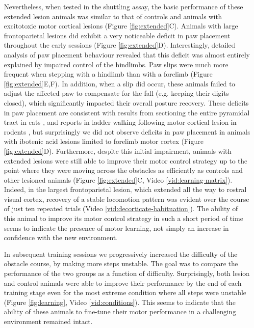 Nevertheless, when tested in the shuttling assay, the basic performance of these extended lesion animals was similar to that of controls and animals with excitotoxic motor cortical lesions (Figure \ref{fig:extended}C). Animals with large frontoparietal lesions did exhibit a very noticeable deficit in paw placement throughout the early sessions (Figure \ref{fig:extended}D). Interestingly, detailed analysis of paw placement behaviour revealed that this deficit was almost entirely explained by impaired control of the hindlimbs. Paw slips were much more frequent when stepping with a hindlimb than with a forelimb (Figure \ref{fig:extended}E,F). In addition, when a slip did occur, these animals failed to adjust the affected paw to compensate for the fall (e.g. keeping their digits closed), which significantly impacted their overall posture recovery. These deficits in paw placement are consistent with results from sectioning the entire pyramidal tract in cats \citep{Liddell1944}, and reports in ladder walking following motor cortical lesion in rodents \citep{Metz2002}, but surprisingly we did not observe deficits in paw placement in animals with ibotenic acid lesions limited to forelimb motor cortex (Figure \ref{fig:extended}D). Furthermore, despite this initial impairment, animals with extended lesions were still able to improve their motor control strategy up to the point where they were moving across the obstacles as efficiently as controls and other lesioned animals (Figure \ref{fig:extended}C, Video \ref{vid:learning-matrix}). Indeed, in the largest frontoparietal lesion, which extended all the way to rostral visual cortex, recovery of a stable locomotion pattern was evident over the course of just ten repeated trials (Video \ref{vid:decorticate-habituation}). The ability of this animal to improve its motor control strategy in such a short period of time seems to indicate the presence of motor learning, not simply an increase in confidence with the new environment.

In subsequent training sessions we progressively increased the difficulty of the obstacle course, by making more steps unstable. The goal was to compare the performance of the two groups as a function of difficulty. Surprisingly, both lesion and control animals were able to improve their performance by the end of each training stage even for the most extreme condition where all steps were unstable (Figure \ref{fig:learning}, Video \ref{vid:conditions}). This seems to indicate that the ability of these animals to fine-tune their motor performance in a challenging environment remained intact.

